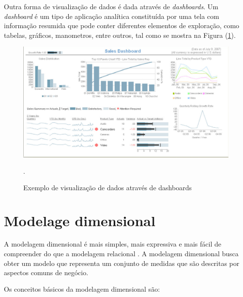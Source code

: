 %

Outra forma de visualização de dados é dada através  de \emph{dashboards}. Um \emph{dashboard} é um tipo de aplicação analítica constituída por uma tela com informação resumida que pode conter diferentes elementos de exploração, como tabelas, gráficos, manometros, entre outros, tal como se mostra na Figura (\ref{dashboard}).

 \begin{figure}[!htb]
 	\centering
 		\includegraphics[scale=0.57]{figuras/dashboard}
 		\caption{Exemplo de visualização de dados através de dashboards}.
 		\label{dashboard}
 \end{figure}



%

\section{Modelage dimensional}
\label{sec-dimensional-modeling}

%

A modelagem dimensional é mais simples, mais expressiva e mais fácil de compreender do que a modelagem relacional \cite{ballard1998}. A modelagem dimensional busca obter um modelo que representa um conjunto de medidas que são descritas por aspectos comuns de negócio.

%

Os conceitos básicos da modelagem dimensional são:

